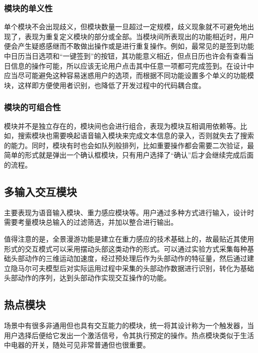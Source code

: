 \subsubsection{模块的单义性}
单个模块不会出现歧义，但模块数量一旦超过一定规模，歧义现象就不可避免地出现了，表现为重复定义模块的部分或全部。当模块间所表现出的功能相近时，用户便会产生疑惑感继而不敢做出操作或是进行重复操作。例如，最常见的是签到功能中日历当日选项和“一键签到”的按钮，其功能意义相近，但点日历也许会有查看当日信息的操作可能，所以应该无论用户点击其中任意一项都可完成签到。在设计中应当尽可能避免这种容易迷惑用户的选项，而根据不同功能设置多个单义的功能模块，这样即方便使用者识别，也降低了开发过程中的代码耦合度。

\subsubsection{模块的可组合性}
模块并不是独立存在的，模块间也会进行组合，表现为模块互相调用依赖等。比如，搜索模块也需要唤起语音输入模块来完成文本信息的录入，否则就失去了搜索的能力。同时，模块有时也会如队列般排列，比如重要操作都会需要二次验证，最简单的形式就是弹出一个确认框模块，只有用户选择了“确认”后才会继续完成后面的流程。


\subsection{多输入交互模块}
主要表现为语音输入模块、重力感应模块等。用户通过多种方式进行输入，设计时需要考量模块总输入的过滤筛选，并加以整合进行输出。

值得注意的是，全景漫游功能是建立在重力感应的技术基础上的，故最贴近其使用形式的交互模式可以采用摆动头部这类动作的形式。可以通过实验方式采集每种基础头部动作的三维运动加速度，经过预处理后作为头部动作的特征量，然后通过建立隐马尔可夫模型后对实际运用过程中采集的头部动作数据进行识别，转化为基础头部动作的序列，达到头部动作实现交互操作的功能。

\subsection{热点模块}
场景中有很多非通用但也具有交互能力的模块，统一将其设计称为一个触发器，当用户选择后便给它发出一个激活信号，令其执行预定的操作。热点模块类似于生活中电器的开关，随处可见非常普通但也很重要。

